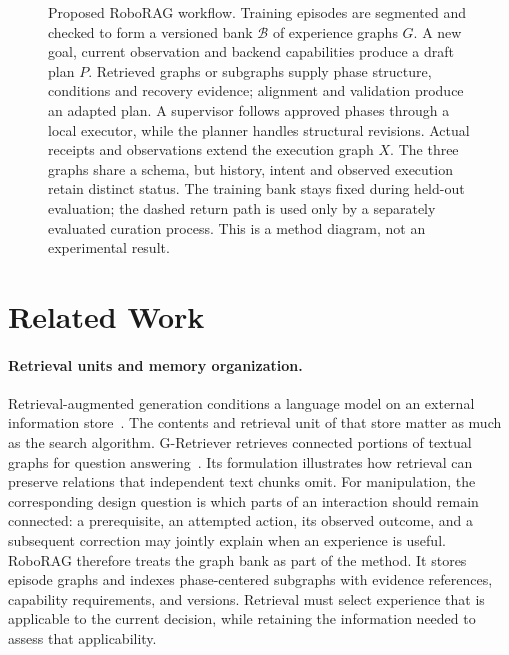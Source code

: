 \documentclass[10pt,twocolumn,letterpaper]{article}
\begin{document}
\begin{figure}[t]
{{}
}
\caption{Proposed RoboRAG workflow. Training episodes are segmented and checked to form a versioned bank $\mathcal{B}$ of experience graphs $G$. A new goal, current observation and backend capabilities produce a draft plan $P$. Retrieved graphs or subgraphs supply phase structure, conditions and recovery evidence; alignment and validation produce an adapted plan. A supervisor follows approved phases through a local executor, while the planner handles structural revisions. Actual receipts and observations extend the execution graph $X$. The three graphs share a schema, but history, intent and observed execution retain distinct status. The training bank stays fixed during held-out evaluation; the dashed return path is used only by a separately evaluated curation process. This is a method diagram, not an experimental result.}
\label{fig:overview}
\end{figure}


\section{Related Work}
\label{sec:related}

\paragraph{Retrieval units and memory organization.}
Retrieval-augmented generation conditions a language model on an external information store~\cite{rag2020}. The contents and retrieval unit of that store matter as much as the search algorithm. G-Retriever retrieves connected portions of textual graphs for question answering~\cite{gretriever2024}. Its formulation illustrates how retrieval can preserve relations that independent text chunks omit. For manipulation, the corresponding design question is which parts of an interaction should remain connected: a prerequisite, an attempted action, its observed outcome, and a subsequent correction may jointly explain when an experience is useful. RoboRAG therefore treats the graph bank as part of the method. It stores episode graphs and indexes phase-centered subgraphs with evidence references, capability requirements, and versions. Retrieval must select experience that is applicable to the current decision, while retaining the information needed to assess that applicability.
\end{document}

